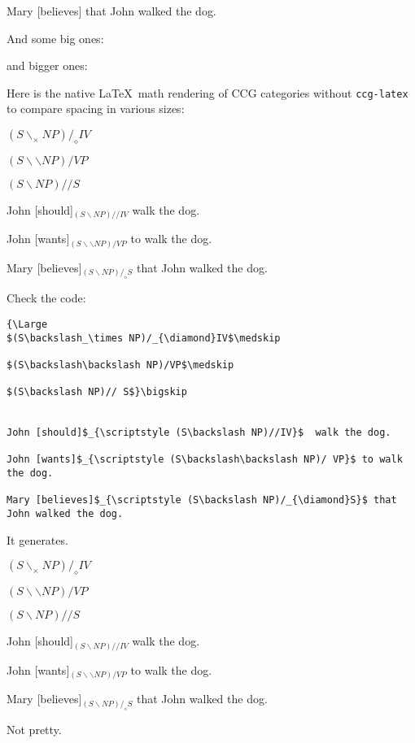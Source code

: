 \documentclass[11pt]{article}
\begin{document}
Mary [believes] that John walked the dog.\bigskip

And some big ones:\bigskip

{\large
{}\smallskip

\smallskip

\smallskip
}\bigskip

and bigger ones:\bigskip

{\Large
{}\smallskip

\smallskip

}\bigskip

Here is the native \LaTeX\, math rendering of CCG categories without \verb|ccg-latex| to compare spacing in various sizes:\bigskip

{\Large 
$(S\backslash_\times NP)/_{\diamond}IV$\medskip

$(S\backslash\backslash NP)/VP$\medskip

$(S\backslash NP)// S$}\bigskip


John [should]$_{\scriptstyle (S\backslash NP)//IV}$  walk the dog.

John [wants]$_{\scriptstyle (S\backslash\backslash NP)/ VP}$ to walk the dog.

Mary [believes]$_{\scriptstyle (S\backslash NP)/_{\diamond}S}$ that John walked the dog.
\newpage

Check the code:\footnotesize

\begin{verbatim}
{\Large 
$(S\backslash_\times NP)/_{\diamond}IV$\medskip

$(S\backslash\backslash NP)/VP$\medskip

$(S\backslash NP)// S$}\bigskip


John [should]$_{\scriptstyle (S\backslash NP)//IV}$  walk the dog.

John [wants]$_{\scriptstyle (S\backslash\backslash NP)/ VP}$ to walk the dog.

Mary [believes]$_{\scriptstyle (S\backslash NP)/_{\diamond}S}$ that John walked the dog.
\end{verbatim}\bigskip


\normalsize It generates. \bigskip

{\Large 
$(S\backslash_\times NP)/_{\diamond}IV$\medskip

$(S\backslash\backslash NP)/VP$\medskip

$(S\backslash NP)// S$}\bigskip


John [should]$_{\scriptstyle (S\backslash NP)//IV}$  walk the dog.

John [wants]$_{\scriptstyle (S\backslash\backslash NP)/ VP}$ to walk the dog.

Mary [believes]$_{\scriptstyle (S\backslash NP)/_{\diamond}S}$ that John walked the dog.\bigskip\bigskip

Not pretty.
\end{document}
